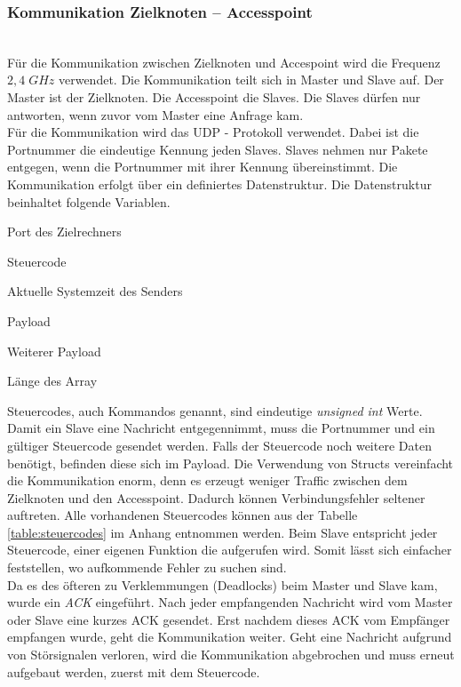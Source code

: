 \subsubsection{Kommunikation Zielknoten -- Accesspoint}\mbox{}\\
Für die Kommunikation zwischen Zielknoten und Accespoint wird die Frequenz $2,4 \;GHz$ verwendet. Die Kommunikation teilt sich in Master und Slave auf. Der Master ist der Zielknoten. Die Accesspoint die Slaves. Die Slaves dürfen nur antworten, wenn zuvor vom Master eine Anfrage kam.
\\
Für die Kommunikation wird das UDP - Protokoll verwendet. Dabei ist die Portnummer die eindeutige Kennung jeden Slaves. Slaves nehmen nur Pakete entgegen, wenn die Portnummer mit ihrer Kennung übereinstimmt. Die Kommunikation erfolgt über ein definiertes Datenstruktur. Die Datenstruktur beinhaltet folgende Variablen.
\newpage
\begin{description}[style=multiline,leftmargin=3cm]
\item [port] 	Port des Zielrechners
\item [cmd]  	Steuercode
\item [systime]	Aktuelle Systemzeit des Senders
\item [data]	Payload
\item [array {[5]}]	Weiterer Payload
\item [len\_ array]	Länge des Array
\end{description}

Steuercodes, auch Kommandos genannt, sind eindeutige \textit{unsigned int} Werte. Damit ein Slave eine Nachricht entgegennimmt, muss die Portnummer und ein gültiger Steuercode gesendet werden. Falls der Steuercode noch weitere Daten benötigt, befinden diese sich im Payload. Die Verwendung von Structs vereinfacht die Kommunikation enorm, denn es erzeugt weniger Traffic zwischen dem Zielknoten und den Accesspoint. Dadurch können Verbindungsfehler seltener auftreten. Alle vorhandenen Steuercodes können aus der Tabelle \ref{table:steuercodes} im Anhang entnommen werden. Beim Slave entspricht jeder Steuercode, einer eigenen Funktion die aufgerufen wird. Somit lässt sich einfacher feststellen, wo aufkommende Fehler zu suchen sind.
\\
Da es des öfteren zu Verklemmungen (Deadlocks) beim Master und Slave kam, wurde ein \textit{ACK} eingeführt. Nach jeder empfangenden Nachricht wird vom Master oder Slave eine kurzes ACK gesendet. Erst nachdem dieses ACK vom Empfänger empfangen wurde, geht die Kommunikation weiter. Geht eine Nachricht aufgrund von Störsignalen verloren, wird die Kommunikation abgebrochen und muss erneut aufgebaut werden, zuerst mit dem Steuercode. 

